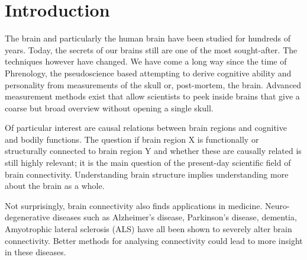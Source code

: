 \documentclass[a4paper, 10pt, english, onecolumn]{article}
\title{\fontfamily{phv}\selectfont{Causal Discovery methods for Effective Connectivity}}
\author{
  \textbf{R. Janssen} - \href{mailto:ramon.janssen@student.ru.nl}{ramon.janssen@student.ru.nl} \\
  \textbf{T. de Ruijter} - \href{mailto:t.deruijter@student.ru.nl}{t.deruijter@student.ru.nl}\\
}
\date{\fontfamily{ptm}\selectfont{\small{\bfseries{\today - Radboud
Universiteit Nijmegen}}}\\[0.5cm]\rule{\linewidth}{0.3mm}}
\begin{document}
\maketitle

\setlength{\parindent}{0.0cm}
\setlength{\parskip}{3mm plus2mm minus1.5mm}

\begin{abstract}
In this work we applied PC algorithm on resting-state data of healthy human subjects.
Additionally we propose a variant of PC algorithm that poses weaker assumptions on the model, better fitting the underlying model.
We find that detecting structure homological areas in the brain works better with PC algorithm than most conventional diffusion weighted imaging techniques.
In the area of directionality and causality, more research is needed.
\end{abstract}

\section{Introduction}
The brain and particularly the human brain have been studied for hundreds of years.
Today, the secrets of our brains still are one of the most sought-after.
The techniques however have changed.
We have come a long way since the time of Phrenology, the pseudoscience based attempting to derive cognitive ability and personality from measurements of the skull or, post-mortem, the brain.
Advanced measurement methods exist that allow scientists to peek inside brains that give a coarse but broad overview without opening a single skull.

Of particular interest are causal relations between brain regions and cognitive and bodily functions.
The question if brain region X is functionally or structurally connected to brain region Y and whether these are causally related is still highly relevant; it is the main question of the present-day scientific field of brain connectivity.
Understanding brain structure implies understanding more about the brain as a whole.

Not surprisingly, brain connectivity also finds applications in medicine.
Neuro-degenerative diseases such as Alzheimer's disease, Parkinson's disease, dementia, Amyotrophic lateral sclerosis (ALS) have all been shown to severely alter brain connectivity. %
Better methods for analysing connectivity could lead to more insight in these diseases.
\end{document}
